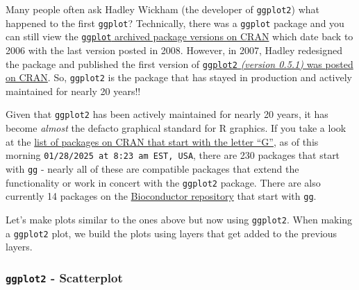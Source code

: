 \documentclass[
  letterpaper,
  DIV=11,
  numbers=noendperiod]{scrartcl}
\begin{document}
\begin{tcolorbox}[enhanced jigsaw, arc=.35mm, colback=white, rightrule=.15mm, toprule=.15mm, colframe=quarto-callout-note-color-frame, opacityback=0, breakable, titlerule=0mm, left=2mm, title=\textcolor{quarto-callout-note-color}{\faInfo}\hspace{0.5em}{Why is the package \texttt{ggplot2} and not \texttt{ggplot}?}, toptitle=1mm, opacitybacktitle=0.6, bottomtitle=1mm, leftrule=.75mm, bottomrule=.15mm, coltitle=black, colbacktitle=quarto-callout-note-color!10!white]

Many people often ask Hadley Wickham (the developer of \texttt{ggplot2})
what happened to the first \texttt{ggplot}? Technically, there was a
\texttt{ggplot} package and you can still view the
\href{https://cran.r-project.org/src/contrib/Archive/ggplot/}{\texttt{ggplot}
archived package versions on CRAN} which date back to 2006 with the last
version posted in 2008. However, in 2007, Hadley redesigned the package
and published the first version of
\href{https://cran.r-project.org/src/contrib/Archive/ggplot2/}{\texttt{ggplot2}
\emph{(version 0.5.1)} was posted on CRAN}. So, \texttt{ggplot2} is the
package that has stayed in production and actively maintained for nearly
20 years!!

\end{tcolorbox}

Given that \texttt{ggplot2} has been actively maintained for nearly 20
years, it has become \emph{almost} the defacto graphical standard for R
graphics. If you take a look at the
\href{https://cran.r-project.org/web/packages/available_packages_by_name.html\#available-packages-G}{list
of packages on CRAN that start with the letter ``G''}, as of this
morning \texttt{01/28/2025\ at\ 8:23\ am\ EST,\ USA}, there are 230
packages that start with \texttt{gg} - nearly all of these are
compatible packages that extend the functionality or work in concert
with the \texttt{ggplot2} package. There are also currently 14 packages
on the
\href{https://www.bioconductor.org/packages/release/BiocViews.html\#___Software}{Bioconductor
repository} that start with \texttt{gg}.

Let's make plots similar to the ones above but now using
\texttt{ggplot2}. When making a \texttt{ggplot2} plot, we build the
plots using layers that get added to the previous layers.

\newpage

\subsubsection{\texorpdfstring{\texttt{ggplot2} -
Scatterplot}{ggplot2 - Scatterplot}}\label{ggplot2---scatterplot}
\end{document}
